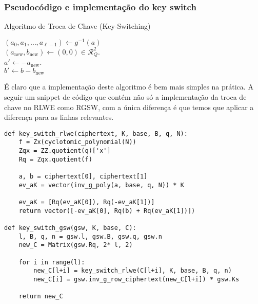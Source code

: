 \subsubsection{Pseudocódigo e implementação do key switch}

\begin{algorithm}[H]
\caption{Algoritmo de Troca de Chave (Key-Switching)}
\label{alg:keyswitch}
\DontPrintSemicolon

$(a_0, a_1, \dots, a_{\ell-1}) \leftarrow g^{-1}(a)$ \\
$(a_{\text{new}}, b_{\text{new}}) \leftarrow (0, 0) \in \mathcal{R}_Q^2$.\\
$a' \leftarrow -a_{\text{new}}$.\\
$b' \leftarrow b - b_{\text{new}}$\\
\end{algorithm}

É claro que a implementação deste algoritmo é bem mais simples na prática. A seguir um snippet de código que contém não só a
implementação da troca de chave no RLWE como RGSW, com a única diferença é que temos que aplicar a diferença para as linhas 
relevantes.

\begin{verbatim}
def key_switch_rlwe(ciphertext, K, base, B, q, N):
    f = Zx(cyclotomic_polynomial(N))
    Zqx = ZZ.quotient(q)['x'] 
    Rq = Zqx.quotient(f)
    
    a, b = ciphertext[0], ciphertext[1]
    ev_aK = vector(inv_g_poly(a, base, q, N)) * K 
    
    ev_aK = [Rq(ev_aK[0]), Rq(-ev_aK[1])]
    return vector([-ev_aK[0], Rq(b) + Rq(ev_aK[1])])

def key_switch_gsw(gsw, K, base, C): 
    l, B, q, n = gsw.l, gsw.B, gsw.q, gsw.n
    new_C = Matrix(gsw.Rq, 2* l, 2)

    for i in range(l):
        new_C[l+i] = key_switch_rlwe(C[l+i], K, base, B, q, n)
        new_C[i] = gsw.inv_g_row_ciphertext(new_C[l+i]) * gsw.Ks

    return new_C
\end{verbatim}